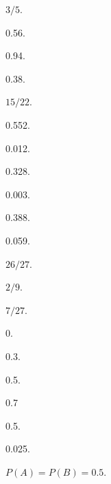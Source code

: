 \begin{answer}
  \item $3/5$.

  \item \begin{enumerate*}
    \item 0.56.
    \item 0.94.
    \item 0.38.
  \end{enumerate*}

  \item $15/22$.

  \item \begin{enumerate*}
    \item 0.552.
    \item 0.012.
    \item 0.328.
  \end{enumerate*}

  \item \begin{enumerate*}
    \item 0.003.
    \item 0.388.
    \item 0.059.
  \end{enumerate*}

  \item \begin{enumerate*}
    \item $26/27$.
    \item $2/9$.
    \item $7/27$.
  \end{enumerate*}

  \item 0.

  \item \begin{enumerate*}
    \item 0.3.
    \item 0.5.
    \item 0.7
  \end{enumerate*}

  \item \begin{enumerate*}
    \item 0.5.
    \item 0.025.
  \end{enumerate*}

  \item $P(A)=P(B)=0.5$.


\end{answer}
